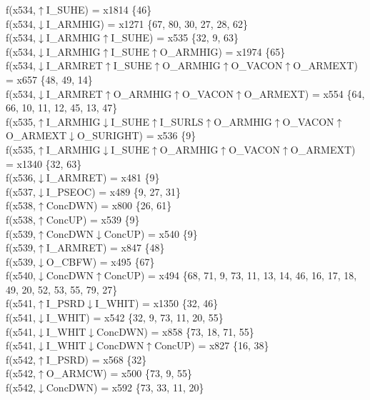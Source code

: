 f(x534,$\uparrow$I\_SUHE) = x1814 \{46\} \\  
f(x534,$\downarrow$I\_ARMHIG) = x1271 \{67, 80, 30, 27, 28, 62\} \\  
f(x534,$\downarrow$I\_ARMHIG$\uparrow$I\_SUHE) = x535 \{32, 9, 63\} \\  
f(x534,$\downarrow$I\_ARMHIG$\uparrow$I\_SUHE$\uparrow$O\_ARMHIG) = x1974 \{65\} \\  
f(x534,$\downarrow$I\_ARMRET$\uparrow$I\_SUHE$\uparrow$O\_ARMHIG$\uparrow$O\_VACON$\uparrow$O\_ARMEXT) = x657 \{48, 49, 14\} \\  
f(x534,$\downarrow$I\_ARMRET$\uparrow$O\_ARMHIG$\uparrow$O\_VACON$\uparrow$O\_ARMEXT) = x554 \{64, 66, 10, 11, 12, 45, 13, 47\} \\  
f(x535,$\uparrow$I\_ARMHIG$\downarrow$I\_SUHE$\uparrow$I\_SURLS$\uparrow$O\_ARMHIG$\uparrow$O\_VACON$\uparrow$O\_ARMEXT$\downarrow$O\_SURIGHT) = x536 \{9\} \\  
f(x535,$\uparrow$I\_ARMHIG$\downarrow$I\_SUHE$\uparrow$O\_ARMHIG$\uparrow$O\_VACON$\uparrow$O\_ARMEXT) = x1340 \{32, 63\} \\  
f(x536,$\downarrow$I\_ARMRET) = x481 \{9\} \\  
f(x537,$\downarrow$I\_PSEOC) = x489 \{9, 27, 31\} \\  
f(x538,$\uparrow$ConcDWN) = x800 \{26, 61\} \\  
f(x538,$\uparrow$ConcUP) = x539 \{9\} \\  
f(x539,$\uparrow$ConcDWN$\downarrow$ConcUP) = x540 \{9\} \\  
f(x539,$\uparrow$I\_ARMRET) = x847 \{48\} \\  
f(x539,$\downarrow$O\_CBFW) = x495 \{67\} \\  
f(x540,$\downarrow$ConcDWN$\uparrow$ConcUP) = x494 \{68, 71, 9, 73, 11, 13, 14, 46, 16, 17, 18, 49, 20, 52, 53, 55, 79, 27\} \\  
f(x541,$\uparrow$I\_PSRD$\downarrow$I\_WHIT) = x1350 \{32, 46\} \\  
f(x541,$\downarrow$I\_WHIT) = x542 \{32, 9, 73, 11, 20, 55\} \\  
f(x541,$\downarrow$I\_WHIT$\downarrow$ConcDWN) = x858 \{73, 18, 71, 55\} \\  
f(x541,$\downarrow$I\_WHIT$\downarrow$ConcDWN$\uparrow$ConcUP) = x827 \{16, 38\} \\  
f(x542,$\uparrow$I\_PSRD) = x568 \{32\} \\  
f(x542,$\uparrow$O\_ARMCW) = x500 \{73, 9, 55\} \\  
f(x542,$\downarrow$ConcDWN) = x592 \{73, 33, 11, 20\} \\  
